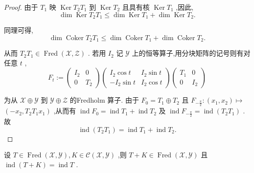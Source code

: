 \documentclass[lang=cn,newtx,10pt,scheme=chinese,thmcnt=chapter]{elegantbook}
\begin{document}
\begin{proof}
    由于 \({T}_{1}\) 映 \(\operatorname{Ker}{T}_{2}{T}_{1}\) 到 \(\operatorname{Ker}{T}_{2}\) 且具有核 \(\operatorname{Ker}{T}_{1}\) ,因此,
\begin{equation*}
\dim \operatorname{Ker}{T}_{2}{T}_{1} \leqslant  \dim \operatorname{Ker}{T}_{1} + \dim \operatorname{Ker}{T}_{2}.
\end{equation*}

同理可得,
\begin{equation*}
\dim \operatorname{Coker}{T}_{2}{T}_{1} \leqslant  \dim \operatorname{Coker}{T}_{1} + \dim \operatorname{Coker}{T}_{2}.
\end{equation*}

从而 \({T}_{2}{T}_{1} \in  \operatorname{Fred}\left( {\mathcal{X},\mathcal{Z}}\right)\) . 若用 \({I}_{2}\) 记 \(\mathcal{Y}\) 上的恒等算子,用分块矩阵的记号则有对任意 \(t\) ,
\begin{equation*}
{F}_{t} \mathrel{\text{ := }} \left( \begin{matrix} {I}_{2} & 0 \\  0 & {T}_{2} \end{matrix}\right) \left( \begin{matrix} {I}_{2}\cos t & {I}_{2}\sin t \\   - {I}_{2}\sin t & {I}_{2}\cos t \end{matrix}\right) \left( \begin{matrix} {T}_{1} & 0 \\  0 & {I}_{2} \end{matrix}\right)
\end{equation*}

为从 \(\mathcal{X} \oplus  \mathcal{Y}\) 到 \(\mathcal{Y} \oplus  \mathcal{Z}\) 的Fredholm 算子. 由于 \({F}_{0} = {T}_{1} \oplus  {T}_{2}\) 且 \({F}_{-\frac{\pi }{2}} : \left( {{x}_{1},{x}_{2}}\right)  \mapsto\)  \(\left( {-{x}_{2},{T}_{2}{T}_{1}{x}_{1}}\right)\) ,从而有 \(\operatorname{ind}{F}_{0} = \operatorname{ind}{T}_{1} + \operatorname{ind}{T}_{2}\) 及 \(\operatorname{ind}{F}_{-\frac{\pi }{2}} = \operatorname{ind}\left( {{T}_{2}{T}_{1}}\right)\) . 故
\begin{equation*}
\operatorname{ind}\left( {{T}_{2}{T}_{1}}\right)  = \operatorname{ind}{T}_{1} + \operatorname{ind}{T}_{2}.
\end{equation*}

\end{proof}
\begin{corollary}
     设 \(T \in  \operatorname{Fred}\left( {\mathcal{X},\mathcal{Y}}\right) ,K \in  \mathcal{C}\left( {\mathcal{X},\mathcal{Y}}\right)\) ,则 \(T + K \in  \operatorname{Fred}\left( {\mathcal{X},\mathcal{Y}}\right)\) 且 \(\operatorname{ind}\left( {T + K}\right)  = \operatorname{ind}T\) .
\end{corollary}
\end{document}
